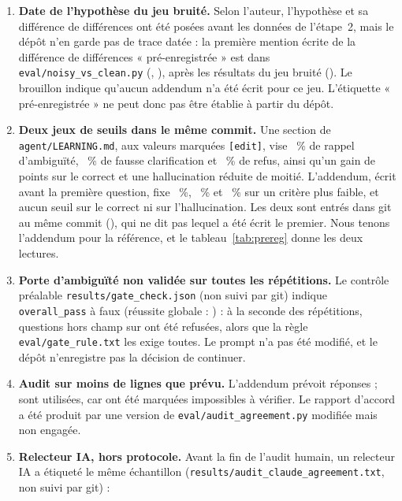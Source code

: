 \begin{enumerate}
        (\EvNoisySwappedIds). La relecture a été déléguée à Claude ; l'auteur n'a pas lu le tableau (\texttt{eval/noisy\_review.md}). Le hachage verrouillé commence par
        \texttt{\EvNoisyHash}.
  \item \textbf{Date de l'hypothèse du jeu bruité.} Selon l'auteur, l'hypothèse et sa différence de différences ont été posées avant les données de l'étape~2, mais le dépôt n'en garde pas de trace datée :
        la première mention écrite de la différence de différences « pré-enregistrée » est dans \texttt{eval/noisy\_vs\_clean.py} (\EvCommitNoisyAnalysis, \EvDateNoisyAnalysis),
        après les résultats du jeu bruité (\EvDateNoisyDone). Le brouillon indique qu'aucun addendum n'a été écrit pour ce jeu. L'étiquette « pré-enregistrée » ne peut donc pas être
        établie à partir du dépôt.
  \item \textbf{Deux jeux de seuils dans le même commit.} Une section de \texttt{agent/LEARNING.md}, aux valeurs marquées \texttt{[edit]}, vise \EvDraftHThree~\% de rappel d'ambiguïté,
        \EvDraftHThreeOver~\% de fausse clarification et \EvDraftHFour~\% de refus, ainsi qu'un gain de \EvDraftHOne{} points sur le correct et une hallucination réduite de moitié. L'addendum, écrit
        avant la première question, fixe \EvPreClarify~\%, \EvPreOver~\% et \EvPreRefuse~\% sur un critère plus faible, et aucun seuil sur le correct ni sur l'hallucination. Les deux sont entrés dans git au même
        commit (\EvCommitAddendum), qui ne dit pas lequel a été écrit le premier. Nous tenons l'addendum pour la référence, et le tableau~\ref{tab:prereg} donne les deux lectures.
  \item \textbf{Porte d'ambiguïté non validée sur toutes les répétitions.} Le contrôle préalable \texttt{results/gate\_check.json} (non suivi par git) indique \texttt{overall\_pass} à faux
        (réussite globale : \EvGateOverall) : à la seconde des \EvGateRepeats{} répétitions, \EvGateRefusedLast{} questions hors champ sur \EvGateRefuseN{} ont été refusées, alors que la règle
        \texttt{eval/gate\_rule.txt} les exige toutes. Le prompt n'a pas été modifié, et le dépôt n'enregistre pas la décision de continuer.
  \item \textbf{Audit sur moins de lignes que prévu.} L'addendum prévoit \EvPreAuditPlanned{} réponses ; \EvAuditUsed{} sont utilisées, car \EvAuditCannot{} ont été marquées impossibles à vérifier. Le rapport d'accord a été
        produit par une version de \texttt{eval/audit\_agreement.py} modifiée mais non engagée.
  \item \textbf{Relecteur IA, hors protocole.} Avant la fin de l'audit humain, un relecteur IA a étiqueté le même échantillon (\texttt{results/audit\_claude\_agreement.txt}, non suivi par git) :

\end{enumerate}
